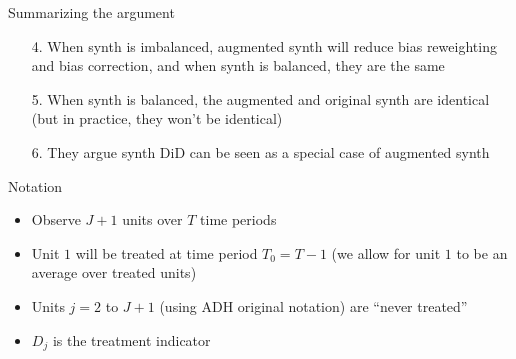 \documentclass{beamer}
\begin{document}
\begin{frame}{Summarizing the argument}

\begin{enumerate}
\item[4. ] When synth is imbalanced, augmented synth will reduce bias reweighting and bias correction, and when synth is balanced, they are the same
\item[5. ] When synth is balanced, the augmented and original synth are identical (but in practice, they won't be identical)
\item[6. ] They argue synth DiD can be seen as a special case of augmented synth
\end{enumerate}

\end{frame}





\begin{frame}{Notation}

\begin{itemize}
\item Observe $J+1$ units over $T$ time periods
\item Unit $1$ will be treated at time period $T_0=T-1$ (we allow for unit $1$ to be an average over treated units)
\item Units $j=2 $ to $J+1$ (using ADH original notation) are ``never treated''
\item $D_j$ is the treatment indicator
\end{itemize}

\end{frame}
\end{document}
